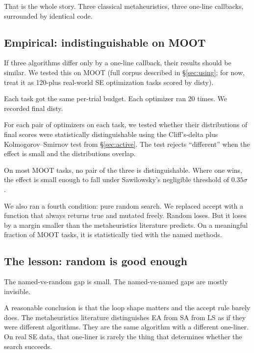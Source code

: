 That is the whole story. Three classical metaheuristics, three
one-line callbacks, surrounded by identical code.

\subsection{Empirical: indistinguishable on MOOT}

If three algorithms differ only by a one-line callback, their
results should be similar. We tested this on MOOT (full corpus
described in \S\ref{sec:using}; for now, treat it as 120-plus
real-world SE optimization tasks scored by \textsf{disty}).

Each task got the same per-trial budget. Each optimizer ran 20
times. We recorded final \textsf{disty}.

For each pair of optimizers on each task, we tested whether
their distributions of final scores were statistically
distinguishable using the Cliff's-delta plus Kolmogorov--Smirnov
test from \S\ref{sec:active}. The test rejects ``different''
when the effect is small and the distributions overlap.


On most MOOT tasks, no pair of the three is distinguishable.
Where one wins, the effect is small enough to fall under
Sawilowsky's negligible threshold of $0.35\sigma$
\cite{sawilowsky2009new}.

We also ran a fourth condition: pure random search. We replaced
\textsf{accept} with a function that always returns true and
mutated freely. Random loses. But it loses by a margin smaller
than the metaheuristics literature predicts. On a meaningful
fraction of MOOT tasks, it is statistically tied with the named
methods.

\subsection*{The lesson: random is good enough}

The named-vs-random gap is small. The named-vs-named gaps are
mostly invisible.

A reasonable conclusion is that the loop shape matters and the
accept rule barely does. The metaheuristics literature
distinguishes EA from SA from LS as if they were different
algorithms. They are the same algorithm with a different
one-liner. On real SE data, that one-liner is rarely the thing
that determines whether the search succeeds.

